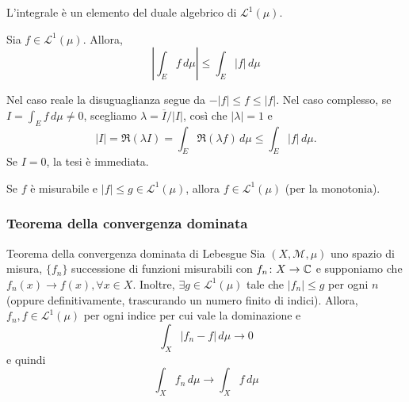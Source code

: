 \documentclass[a4paper]{article}
\begin{document}
\begin{radioactive}
L'integrale è un elemento del duale algebrico di \(\mathcal L^1(\mu)\).
\end{radioactive}

\begin{radioactive}
\begin{snippettheorem}{}
    Sia \(f \in \mathcal L^1(\mu)\). Allora,
    \[
        \left|\int_E f\,d\mu \right|
        \leq \int_E |f|\,d\mu
    \]
\end{snippettheorem}
\end{radioactive}

\begin{radioactive}
\begin{snippetproof}{}
    Nel caso reale la disuguaglianza segue da \(-|f|\leq f\leq|f|\).
    Nel caso complesso, se \(I=\int_E f\,d\mu\neq0\), scegliamo
    \(\lambda=\overline I/|I|\), così che \(|\lambda|=1\) e
    \[
        |I|=\Re(\lambda I)
        =\int_E \Re(\lambda f)\,d\mu
        \leq\int_E|f|\,d\mu.
    \]
    Se \(I=0\), la tesi è immediata.
\end{snippetproof}
\end{radioactive}

\begin{radioactive}
Se \(f\) è misurabile e \(|f| \leq g \in \mathcal L^1(\mu)\),
allora \(f \in \mathcal L^1(\mu)\)
(per la monotonia).
\end{radioactive}

\subsubsection{Teorema della convergenza dominata}

\begin{radioactive}
\begin{snippettheorem}{Teorema della convergenza dominata di Lebesgue}
    Sia \((X, \mathcal M, \mu)\) uno spazio di misura, \(\{f_n\}\) successione
    di funzioni misurabili con \(f_n \colon X \to \mathbb{C}\)
    e supponiamo che \(f_n(x) \to f(x), \forall x \in X\).
    Inoltre, \(\exists g \in \mathcal L^1(\mu)\) tale che
    \(|f_n|\leq g\) per ogni \(n\) (oppure definitivamente, trascurando un numero finito di indici).
    Allora,
    \(f_n,f\in\mathcal L^1(\mu)\) per ogni indice per cui vale la dominazione
    e \[
        \int_X|f_n-f|\,d\mu \to 0
    \]
    e quindi \[
        \int_X f_n \,d\mu \to \int_X f \,d\mu
    \]
\end{snippettheorem}
\end{radioactive}
\end{document}
